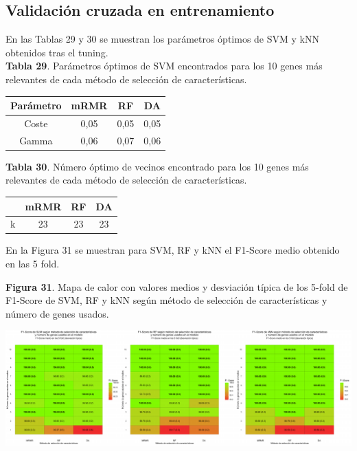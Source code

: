\subsection{Validación cruzada en entrenamiento}

En las Tablas 29 y 30 se muestran los parámetros óptimos de SVM y kNN obtenidos tras el tuning.\\

\textbf{Tabla 29}. Parámetros óptimos de SVM encontrados para los 10 genes más relevantes de cada método de selección de características.

\begin{table}[H]
	\centering
	\begin{tabular}{cccc}
		\hline
		\textbf{Parámetro} & \textbf{mRMR} & \textbf{RF} & \textbf{DA} \\ \hline
		Coste                &    0,05 &    0,05     &  0,05       \\
		Gamma               &     0,06    &     0,07   & 0,06        \\ \hline
	\end{tabular}
\end{table}

\textbf{Tabla 30}. Número óptimo de vecinos encontrado para los 10 genes más relevantes de cada método de selección de características.

\begin{table}[H]
	\centering
	\begin{tabular}{cccc}
		\cline{2-4}
		\textbf{} & \textbf{mRMR} & \textbf{RF} & \textbf{DA} \\ \hline
		k                &   23 &   23     &   23      \\ \hline
	\end{tabular}
\end{table}

En la Figura 31 se muestran para SVM, RF y kNN el F1-Score medio obtenido en las 5 fold.\\

\begin{center}
\textbf{Figura 31}. Mapa de calor con valores medios y desviación típica de los 5-fold de F1-Score de SVM, RF y kNN según método de selección de características y número de genes usados.
\end{center}
\begin{center}
	\includegraphics[width=1\textwidth]{figuras/31_cr_biclase_heatmap_horizontal.pdf} 
\end{center}

